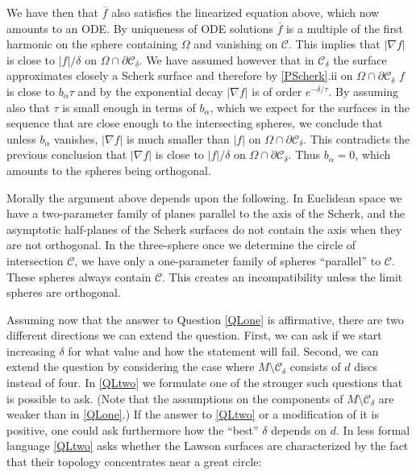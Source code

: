 \documentclass[12pt,namelimits,sumlimits]{amsart}
\theoremstyle{remark}
\numberwithin{equation}{section}
\begin{document}
We have then that $\overline{f}$ also satisfies the linearized equation above,
which now amounts to an ODE.
By uniqueness of ODE solutions $\overline{f}$ is a multiple of the first harmonic on the sphere containing $\Omega$
and vanishing on ${{\mathcal{C}}}$.
This implies that $|\nabla f|$ is close to $|f|/\delta$ on $\Omega\cap\partial{{\mathcal{C}}}_\delta$.
We have assumed however that in ${{\mathcal{C}}}_\delta$ the surface approximates closely a Scherk surface
and therefore by \ref{PScherk}.ii on $\Omega\cap\partial{{\mathcal{C}}}_\delta$
$f$ is close to $b_\alpha\tau$ and by the exponential decay $|\nabla f|$ is of order $e^{-\delta/\tau}$.
By assuming also that $\tau$ is small enough in terms of $b_\alpha$,
which we expect for the surfaces in the sequence that are close enough to the intersecting spheres,
we conclude that unless $b_{\alpha}$ vanishes,
$|\nabla f|$ is much smaller than $|f|$ on $\Omega\cap\partial{{\mathcal{C}}}_\delta$.
This contradicts the previous conclusion that 
$|\nabla f|$ is close to $|f|/\delta$ on $\Omega\cap\partial{{\mathcal{C}}}_\delta$.
Thus $b_{\alpha}=0$,
which amounts to the spheres being orthogonal.

Morally the argument above depends upon the following.
In Euclidean space we have a two-parameter family of planes parallel to the axis of the Scherk,
and the asymptotic half-planes of the Scherk surfaces do not contain the axis when they are not orthogonal.
In the three-sphere once we determine the circle of intersection ${{\mathcal{C}}}$,
we have only a one-parameter family of spheres ``parallel'' to ${{\mathcal{C}}}$.
These spheres always contain ${{\mathcal{C}}}$.
This creates an incompatibility unless the limit spheres are orthogonal.

Assuming now that the answer to Question \ref{QLone} is affirmative,
there are two different directions we can extend the question.
First, we can ask if we start increasing $\delta$ for what value and how the statement will fail.
Second, we can extend the question by considering the case where $M\setminus {{\mathcal{C}}}_\delta$ consists of $d$ discs instead of four.
In \ref{QLtwo} we formulate one of the stronger such questions that is possible to ask.
(Note that the assumptions on the components of $M\setminus {{\mathcal{C}}}_\delta$ are weaker than in \ref{QLone}.)
If the answer to \ref{QLtwo} or a modification of it is positive,
one could ask furthermore how the ``best'' $\delta$ depends on $d$.
In less formal language \ref{QLtwo} asks whether the Lawson surfaces are characterized by the fact
that their topology concentrates near a great circle:
\end{document}

